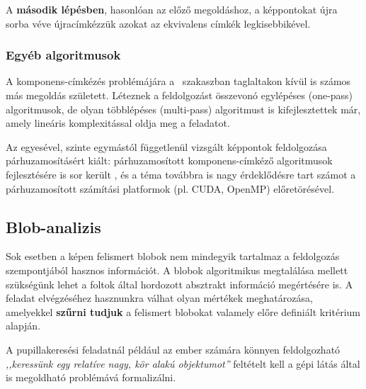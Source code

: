 A \textbf{második lépésben}, hasonlóan az előző megoldáshoz, a képpontokat újra sorba véve újracímkézzük azokat az ekvivalens címkék legkisebbikével.

\subsubsection{Egyéb algoritmusok}\label{sect:blob_egyeb}

A komponens-címkézés problémájára a ~szakaszban taglaltakon kívül is számos más megoldás született. Léteznek a feldolgozást összevonó egylépéses (one-pass) algoritmusok, de olyan többlépéses (multi-pass) algoritmust is kifejlesztettek már, amely lineáris komplexitással oldja meg a feladatot. \cite{suzuki_lin}

Az egyesével, szinte egymástól függetlenül vizsgált képpontok feldolgozása párhuzamosításért kiált: párhuzamosított komponens-címkéző algoritmusok fejlesztésére is sor került \cite{comp_parallel}, és a téma továbbra is nagy érdeklődésre tart számot a párhuzamosított számítási platformok (pl. CUDA, OpenMP) előretörésével.

\subsection{Blob-analizis}\label{sect:blob_analizis}

Sok esetben a képen felismert blobok nem mindegyik tartalmaz a feldolgozás szempontjából hasznos információt. A blobok algoritmikus megtalálása mellett szükségünk lehet a foltok által hordozott absztrakt információ megértésére is. A feladat elvégzéséhez hasznunkra válhat olyan mértékek meghatározása, amelyekkel \textbf{szűrni tudjuk} a felismert blobokat valamely előre definiált kritérium alapján.

A pupillakeresési feladatnál például az ember számára könnyen feldolgozható \emph{,,keressünk egy relatíve nagy, kör alakú objektumot''} feltételt kell a gépi látás által is megoldható problémává formalizálni.

